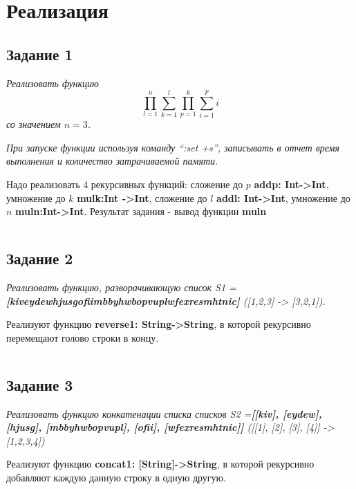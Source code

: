 \documentclass[12pt]{article} %
\begin{document}
\begin{center}

\end{center}
\doublespacing
\tableofcontents
\newpage
\section{Реализация}
\subsection{Задание 1}
\textit{
	Реализовать функцию 
\[ \prod_{l=1}^{n}\sum_{k=1}^{l}\prod_{p=1}^{k}\sum_{i=1}^{p}i \]
со значением $n = 3$.}

\textit{
При запуске функции используя команду “:set +s”, записывать в отчет время выполнения и количество затрачиваемой памяти.
}

Надо реализовать 4 рекурсивных функций: сложение до $p$ \textbf{addp: Int->Int}, умножение до $k$ \textbf{mulk:Int ->Int}, сложение до $l$ \textbf{addl: Int->Int}, умножение до $n$ \textbf{muln:Int->Int}. Результат задания - вывод функции \textbf{muln}


\inputminted[firstline= 8, lastline = 22, frame=single]{Haskell}{F:/git/FuncProg/Assignment1/Assign1.hs}
\subsection{Задание 2}

\textit{
Реализовать функцию, разворачивающую список S1 = \\ \textbf{[kiveydewhjusgofiimbbyhwbopvuplwfexresmhtnic]} ([1,2,3] -> [3,2,1]).
}

Реализуют функцию \textbf{reverse1: String->String}, в которой рекурсивно перемещают голово строки в концу. 

\inputminted[firstline = 29, lastline = 31, frame= single]{Haskell}{F:/git/FuncProg/Assignment1/Assign1.hs}

\subsection{Задание 3}

\textit{
Реализовать функцию конкатенации списка списков S2 =\textbf{[[kiv], [eydew], [hjusg], [mbbyhwbopvupl], [ofii], [wfexresmhtnic]]} ([[1], [2], [3], [4]] -> [1,2,3,4])
}

Реализуют функцию \textbf{concat1: [String]->String}, в которой рекурсивно добавляют каждую данную строку в одную другую.
\end{document}
